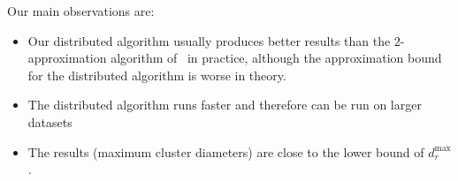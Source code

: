 








%






Our main observations are:

\begin{itemize}
\item Our distributed algorithm usually produces better results than the $2$-approximation algorithm of~\cite{Aggarwal06achievinganonymity} in practice, although the approximation bound for the distributed algorithm is worse in theory.
\item The distributed algorithm runs faster and therefore can be run on larger datasets
\item The results (maximum cluster diameters) are close to the lower bound of $d_{r}^{\max}$.
\end{itemize}


%

